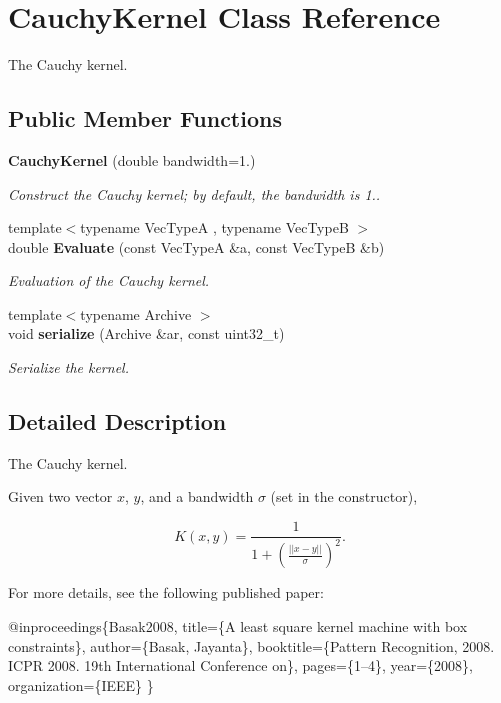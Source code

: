 \section{Cauchy\+Kernel Class Reference}
\label{classmlpack_1_1kernel_1_1CauchyKernel}


The Cauchy kernel.  


\subsection*{Public Member Functions}
\begin{DoxyCompactItemize}
\item 
\textbf{ Cauchy\+Kernel} (double bandwidth=1.)
\begin{DoxyCompactList}\small\item\em Construct the Cauchy kernel; by default, the bandwidth is 1.. \end{DoxyCompactList}\item 
{\footnotesize template$<$typename Vec\+TypeA , typename Vec\+TypeB $>$ }\\double \textbf{ Evaluate} (const Vec\+TypeA \&a, const Vec\+TypeB \&b)
\begin{DoxyCompactList}\small\item\em Evaluation of the Cauchy kernel. \end{DoxyCompactList}\item 
{\footnotesize template$<$typename Archive $>$ }\\void \textbf{ serialize} (Archive \&ar, const uint32\+\_\+t)
\begin{DoxyCompactList}\small\item\em Serialize the kernel. \end{DoxyCompactList}\end{DoxyCompactItemize}


\subsection{Detailed Description}
The Cauchy kernel. 

Given two vector $ x $, $ y $, and a bandwidth $ \sigma $ (set in the constructor),

\[ K(x, y) = \frac{1}{1 + (\frac{|| x - y ||}{\sigma})^2}. \]

For more details, see the following published paper\+:


\begin{DoxyCode}
@inproceedings\{Basak2008,
  title=\{A least square kernel machine with box constraints\},
  author=\{Basak, Jayanta\},
  booktitle=\{Pattern Recognition, 2008. ICPR 2008. 19th International
      Conference on\},
  pages=\{1--4\},
  year=\{2008\},
  organization=\{IEEE\}
\}
\end{DoxyCode}
 

